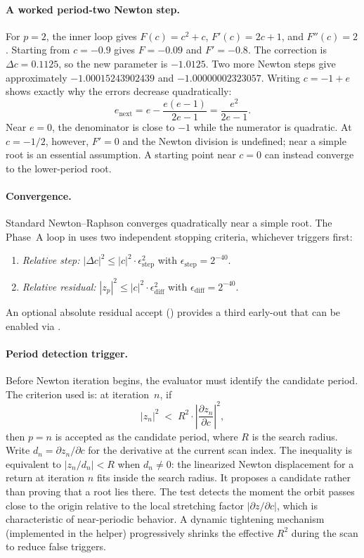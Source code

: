 \paragraph{A worked period-two Newton step.}
For $p=2$, the inner loop gives
$F(c)=c^2+c$, $F'(c)=2c+1$, and $F''(c)=2$.
Starting from $c=-0.9$ gives $F=-0.09$ and $F'=-0.8$.
The correction is $\Delta c=0.1125$, so the new parameter is
$-1.0125$.  Two more Newton steps give approximately
$-1.00015243902439$ and $-1.00000002323057$.
Writing $c=-1+e$ shows exactly why the errors decrease quadratically:
\[
e_{\mathrm{next}}
=e-\frac{e(e-1)}{2e-1}
=\frac{e^2}{2e-1}.
\]
Near $e=0$, the denominator is close to $-1$ while the numerator is
quadratic.  At $c=-1/2$, however, $F'=0$ and the Newton division is
undefined; near a simple root is an essential assumption.
A starting point near $c=0$ can instead converge to the lower-period root.

\paragraph{Convergence.}
Standard Newton--Raphson converges quadratically near a simple root.  The
Phase~A loop in  uses two independent
stopping criteria, whichever triggers first:
\begin{enumerate}
\item \emph{Relative step:}
  $|\Delta c|^2 \le |c|^2 \cdot \epsilon_{\mathrm{step}}^2$
  with $\epsilon_{\mathrm{step}} = 2^{-40}$.
\item \emph{Relative residual:}
  $|z_p|^2 \le |c|^2 \cdot \epsilon_{\mathrm{diff}}^2$
  with $\epsilon_{\mathrm{diff}} = 2^{-40}$.
\end{enumerate}
An optional absolute residual accept () provides a third
early-out that can be enabled via .

\paragraph{Period detection trigger.}
Before Newton iteration begins, the evaluator must identify the candidate
period.  The criterion used is: at iteration~$n$, if
\begin{equation}\label{eq:ff-period-trigger}
|z_n|^2 \;<\; R^2 \cdot \left|\frac{\partial z_n}{\partial c}\right|^2,
\end{equation}
then $p = n$ is accepted as the candidate period, where $R$ is the search
radius.  Write $d_n=\partial z_n/\partial c$ for the derivative at the
current scan index.  The inequality is equivalent to $|z_n/d_n|<R$ when
$d_n\ne0$: the linearized Newton displacement for a return at iteration $n$
fits inside the search radius.  It proposes a candidate rather than proving that a root lies there.
The test detects the moment the orbit passes close to the origin
relative to the local stretching factor $|\partial z/\partial c|$, which is
characteristic of near-periodic behavior.  A dynamic tightening mechanism
(implemented in the  helper) progressively shrinks the
effective $R^2$ during the scan to reduce false triggers.

